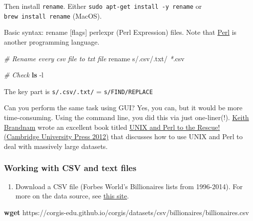 \documentclass[
]{book}
\newenvironment{Shaded}{\begin{snugshade}}{\end{snugshade}}
\newcommand{\AttributeTok}[1]{\textcolor[rgb]{0.13,0.29,0.53}{#1}}
\newcommand{\CommentTok}[1]{\textcolor[rgb]{0.56,0.35,0.01}{\textit{#1}}}
\newcommand{\ExtensionTok}[1]{#1}
\newcommand{\FunctionTok}[1]{\textcolor[rgb]{0.13,0.29,0.53}{\textbf{#1}}}
\newcommand{\NormalTok}[1]{#1}
\newcommand{\PreprocessorTok}[1]{\textcolor[rgb]{0.56,0.35,0.01}{\textit{#1}}}
\newcommand{\StringTok}[1]{\textcolor[rgb]{0.31,0.60,0.02}{#1}}
\providecommand{\tightlist}{%
  \setlength{\itemsep}{0pt}\setlength{\parskip}{0pt}}
\begin{document}
Then install \texttt{rename}. Either \texttt{sudo\ apt-get\ install\ -y\ rename} or \texttt{brew\ install\ rename} (MacOS).

Basic syntax: rename {[}flags{]} perlexpr (Perl Expression) files. Note that \href{https://en.wikipedia.org/wiki/Perl}{Perl} is another programming language.

\begin{Shaded}
\begin{Highlighting}[]
\CommentTok{\# Rename every csv file to txt file}
\ExtensionTok{rename} \StringTok{\textquotesingle{}s/.csv/.txt/\textquotesingle{}} \PreprocessorTok{*}\NormalTok{.csv}

\CommentTok{\# Check}
\FunctionTok{ls} \AttributeTok{{-}l}
\end{Highlighting}
\end{Shaded}

The key part is \texttt{s/.csv/.txt/} = \texttt{s/FIND/REPLACE}

Can you perform the same task using GUI? Yes, you can, but it would be more time-consuming. Using the command line, you did this via just one-liner(!). \href{http://korflab.ucdavis.edu/Bios/bio_keithb.html}{Keith Brandnam} wrote an excellent book titled \href{https://www.amazon.com/Unix-Perl-Rescue-Keith-Bradnam/dp/0521169828}{UNIX and Perl to the Rescue! (Cambridge University Press 2012)} that discusses how to use UNIX and Perl to deal with massively large datasets.

\subsubsection{Working with CSV and text files}\label{working-with-csv-and-text-files}

\begin{enumerate}
\def\labelenumi{\arabic{enumi}.}
\tightlist
\item
  Download a CSV file (Forbes World's Billionaires lists from 1996-2014). For more on the data source, see \href{https://corgis-edu.github.io/corgis/csv/billionaires/}{this site}.
\end{enumerate}

\begin{Shaded}
\begin{Highlighting}[]
\FunctionTok{wget}\NormalTok{ https://corgis{-}edu.github.io/corgis/datasets/csv/billionaires/billionaires.csv}
\end{Highlighting}
\end{Shaded}
\end{document}
